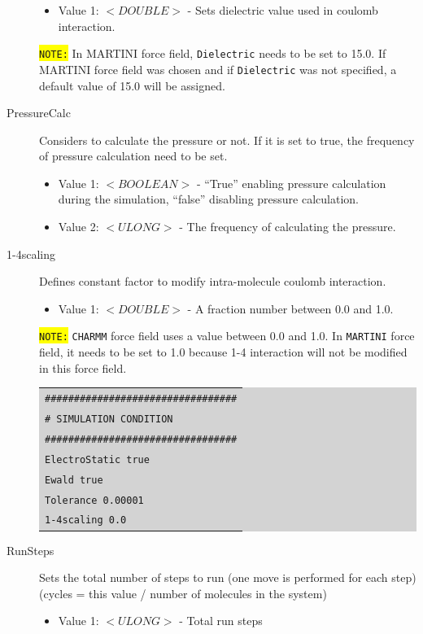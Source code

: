 \begin{description}
\begin{itemize}
	\item Value 1: $<DOUBLE>$ - Sets dielectric value used in coulomb interaction.
	\end{itemize}
	\colorbox{yellow}{\texttt{NOTE:}} In MARTINI force field, \texttt{Dielectric} needs to be set to 15.0. If MARTINI force field was chosen and if \texttt{Dielectric} was not specified, a default value of 15.0 will be assigned.
\item [PressureCalc] Considers to calculate the pressure or not. If it is set to true, the frequency of pressure calculation need to be set.
	\begin{itemize}
	\item Value 1: $<BOOLEAN>$ - ``True'' enabling pressure calculation during the simulation, ``false'' disabling pressure calculation.
	\item Value 2: $<ULONG>$ - The frequency of calculating the pressure.
	\end{itemize}
\item [1-4scaling] Defines constant factor to modify intra-molecule coulomb interaction.
	\begin{itemize}
	\item Value 1: $<DOUBLE>$ - A fraction number between 0.0 and 1.0.
	\end{itemize}
	\colorbox{yellow}{\texttt{NOTE:}} \texttt{CHARMM} force field uses a value between 0.0 and 1.0. In \texttt{MARTINI} force field, it needs to be set to 1.0 because 1-4 interaction will not be modified in this force field.\\
	\colorbox{lightgray}{
	\begin{tabular}{l}
	\texttt{\#\#\#\#\#\#\#\#\#\#\#\#\#\#\#\#\#\#\#\#\#\#\#\#\#\#\#\#\#\#\#\#\#}\\
	\texttt{\# SIMULATION CONDITION}\\
	\texttt{\#\#\#\#\#\#\#\#\#\#\#\#\#\#\#\#\#\#\#\#\#\#\#\#\#\#\#\#\#\#\#\#\#}\\
	\texttt{ElectroStatic 		true}\\
	\texttt{Ewald		   		true}\\
	\texttt{Tolerance	        	0.00001}\\
	\texttt{1-4scaling			0.0}\\
	\end{tabular}}
\item [RunSteps] Sets the total number of steps to run (one move is performed for each step) (cycles = this value / number of molecules in the system)
	\begin{itemize}
	\item Value 1: $<ULONG>$ - Total run steps

\end{itemize}
\end{description}
